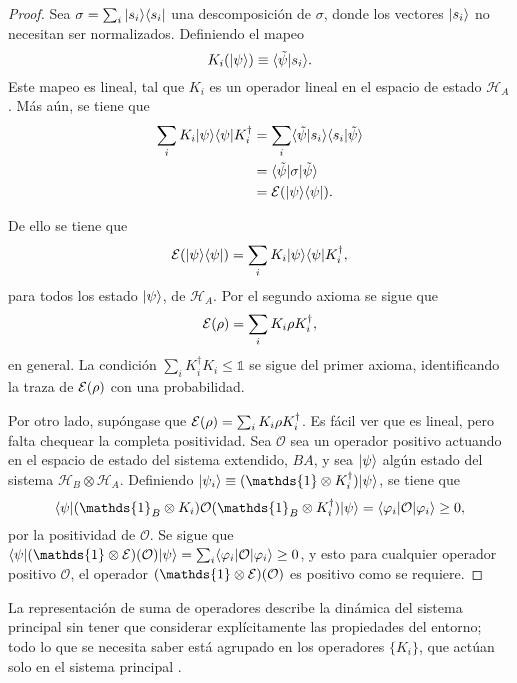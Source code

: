 \begin{proof}
Sea $\sigma=\sum_i|s_i\rangle \langle s_i|$ una descomposición de $\sigma$, donde los vectores $|s_i\rangle$ no necesitan ser normalizados. Definiendo el mapeo \[K_i(|\psi\rangle) \equiv \langle\tilde{\psi}|s_i\rangle.\] Este mapeo es lineal, tal que $K_i$ es un operador lineal en el espacio de estado $\mathcal{H}_A$. Más aún, se tiene que 
\begin{equation}
    \begin{split}
       \sum_i K_i |\psi \rangle \langle \psi |K_i^\dagger&=\sum_i  \langle\tilde{\psi}|s_i\rangle \langle s_i|\tilde{\psi}\rangle\\
        &=\langle \tilde \psi |\sigma |\tilde{\psi}\rangle\\
        &=\mathcal{E}(|\psi \rangle \langle\psi|).\\
    \end{split}
\end{equation}



De ello se tiene que  \[\mathcal{E}(|\psi\rangle \langle \psi|)=\sum_i K_i |\psi \rangle \langle \psi |K_i^\dagger,\] para todos los estado $|\psi\rangle$, de $\mathcal{H}_A$. Por el segundo axioma se sigue que \[\mathcal{E}(\rho)=\sum_i K_i \rho K_i^\dagger,\] en general. La condición $\sum_i K_i^\dagger K_i\le \mathds{1}$ se sigue del primer axioma, identificando la traza de $\mathcal{E}(\rho) $ con una probabilidad.


Por otro lado, supóngase que $\mathcal{E}(\rho)=\sum_i K_i \rho K_i^\dagger$. Es fácil ver que es lineal, pero falta chequear la completa positividad. Sea $\mathcal{O}$ sea un operador positivo actuando en el espacio de estado del sistema extendido, $BA$, y sea $|\psi \rangle$ algún estado del sistema $\mathcal{H}_B\otimes \mathcal{H}_A$. Definiendo $|\psi_i\ra \equiv (\mathds{1}\otimes K_i^\dagger)|\psi\ra$, se tiene que \[\la \psi |(\mathds{1}_B\otimes K_i)\mathcal{O}(\mathds{1}_B\otimes K_i^\dagger)|\psi\ra=\la \varphi_i |\mathcal{O}|\varphi_i\ra \ge 0,\] por la positividad de $\mathcal{O}$. Se sigue que $\la \psi| (\mathds{1}\otimes\E)(\mathcal{O})|\psi\ra=\sum_i \la \varphi_i|\mathcal{O}|\varphi_i\ra \ge 0$, y esto para cualquier operador positivo $\mathcal{O}$, el operador $(\mathds{1}\otimes \E)(\mathcal{O})$ es positivo como se requiere.
\end{proof}

La representación de suma de operadores describe la dinámica del sistema principal sin tener que considerar explícitamente las propiedades del entorno; todo lo que se necesita saber está agrupado en los operadores $\{K_i\}$, que actúan solo en el sistema principal {\cite{nielsen_chuang_2010}}.

